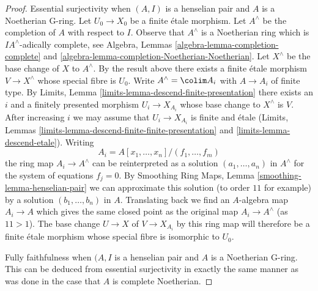 \begin{proof}
\medskip\noindent
Essential surjectivity when $(A, I)$ is a henselian pair
and $A$ is a Noetherian G-ring.
Let $U_0 \to X_0$ be a finite \'etale morphism.
Let $A^\wedge$ be the completion of $A$ with respect to $I$.
Observe that $A^\wedge$ is a Noetherian ring which is
$IA^\wedge$-adically complete, see Algebra, Lemmas
\ref{algebra-lemma-completion-complete} and
\ref{algebra-lemma-completion-Noetherian-Noetherian}.
Let $X^\wedge$ be the base change of $X$ to $A^\wedge$.
By the result above there exists a finite \'etale morphism
$V \to X^\wedge$ whose special fibre is $U_0$.
Write $A^\wedge = \colim A_i$ with $A \to A_i$ of finite type.
By Limits, Lemma \ref{limits-lemma-descend-finite-presentation}
there exists an $i$ and a finitely presented morphism $U_i \to X_{A_i}$
whose base change to $X^\wedge$ is $V$. After increasing $i$
we may assume that $U_i \to X_{A_i}$ is finite and \'etale
(Limits, Lemmas \ref{limits-lemma-descend-finite-finite-presentation} and
\ref{limits-lemma-descend-etale}). Writing
$$
A_i = A[x_1, \ldots, x_n]/(f_1, \ldots, f_m)
$$
the ring map $A_i \to A^\wedge$ can be reinterpreted as a solution
$(a_1, \ldots, a_n)$ in $A^\wedge$ for the system of equations $f_j = 0$.
By Smoothing Ring Maps, Lemma \ref{smoothing-lemma-henselian-pair}
we can approximate this solution (to order $11$ for example) by a solution
$(b_1, \ldots, b_n)$ in $A$. Translating back we find an $A$-algebra map
$A_i \to A$ which gives the same closed point as the original map
$A_i \to A^\wedge$ (as $11 > 1$). The base change $U \to X$ of $V \to X_{A_i}$
by this ring map will therefore be a finite \'etale morphism whose
special fibre is isomorphic to $U_0$.

\medskip\noindent
Fully faithfulness when $(A, I$ is a henselian pair and $A$ is a Noetherian
G-ring. This can be deduced from essential surjectivity in exactly the same
manner as was done in the case that $A$ is complete Noetherian.


\end{proof}
